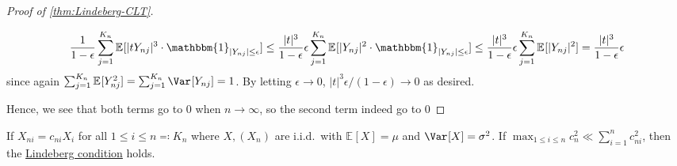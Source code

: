 \begin{proof}[Proof of \autoref{thm:Lindeberg-CLT}]
\begin{itemize}
		      \[
			      \frac{1}{1 - \epsilon } \sum_{j=1}^{K_n} \mathbb{E}_{}[\vert t Y_{nj} \vert ^3 \cdot \mathbbm{1}_{\vert Y_{nj} \vert \leq \epsilon } ]
			      \leq \frac{\vert t \vert ^3}{1 - \epsilon } \epsilon \sum_{j=1}^{K_n} \mathbb{E}_{}[\vert Y_{nj} \vert ^2 \cdot \mathbbm{1}_{\vert Y_{nj} \vert \leq \epsilon } ]
			      \leq \frac{\vert t \vert ^3}{1 - \epsilon } \epsilon \sum_{j=1}^{K_n} \mathbb{E}_{}[\vert Y_{nj} \vert ^2 ]
			      = \frac{\vert t \vert ^3}{1 - \epsilon } \epsilon
		      \]
		      since again \(\sum_{j=1}^{K_n} \mathbb{E}_{}[Y_{nj}^2] = \sum_{j=1}^{K_n} \Var_{}[Y_{nj}] = 1\). By letting \(\epsilon \to 0\), \(\vert t \vert ^3 \epsilon / (1 - \epsilon ) \to 0\) as desired.
	\end{itemize}
	Hence, we see that both terms go to \(0\) when \(n \to \infty \), so the second term indeed go to \(0\)
\end{proof}

\begin{corollary}\label{Hajek-Sidak-CLT}
	If \(X_{ni} = c_{ni} X_i\) for all \(1 \leq i \leq n \eqqcolon K_n\) where \(X, (X_n)\) are i.i.d.\ with \(\mathbb{E}_{}[X] = \mu \) and \(\Var_{}[X] = \sigma ^2\). If \(\max _{1 \leq i \leq n} c_n^2 \ll \sum_{i=1}^{n} c_{ni}^2\), then the \hyperref[def:Lindeberg-condition]{Lindeberg condition} holds.
\end{corollary}